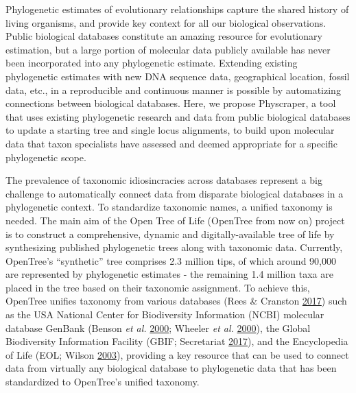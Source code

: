 \documentclass[]{article}
\begin{document}
Phylogenetic estimates of evolutionary relationships capture the shared history of living organisms, and provide key context for all our biological observations.
Public biological databases constitute an amazing resource for evolutionary estimation, but a large portion of molecular data publicly available has never been incorporated into any phylogenetic estimate. Extending existing phylogenetic estimates with new DNA sequence data, geographical location, fossil data, etc., in a reproducible and continuous manner is possible by automatizing connections between biological databases. Here, we propose Physcraper, a tool that uses existing phylogenetic research and data from public biological databases to update a starting tree and single locus alignments, to build upon molecular data that taxon specialists have assessed and deemed appropriate for a specific phylogenetic scope.

The prevalence of taxonomic idiosincracies across databases represent a big challenge to automatically connect data from disparate biological databases in a phylogenetic context. To standardize taxonomic names, a unified taxonomy is needed. The main aim of the Open Tree of Life (OpenTree from now on) project
is to construct a comprehensive, dynamic and digitally-available tree of life by synthesizing published phylogenetic trees along with taxonomic data. Currently, OpenTree's ``synthetic'' tree comprises 2.3 million tips, of which around 90,000 are represented by phylogenetic estimates - the remaining 1.4 million taxa are placed in the tree based on their taxonomic assignment. To achieve this, OpenTree unifies taxonomy from various databases (Rees \& Cranston \protect\hyperlink{ref-rees2017automated}{2017}) such as the USA National Center for Biodiversity Information (NCBI) molecular database GenBank (Benson \emph{et al.} \protect\hyperlink{ref-benson2000genbank}{2000}; Wheeler \emph{et al.} \protect\hyperlink{ref-wheeler2000database}{2000}), the Global Biodiversity Information Facility (GBIF; Secretariat \protect\hyperlink{ref-secretariat2017gbif}{2017}), and the Encyclopedia of Life (EOL; Wilson \protect\hyperlink{ref-wilson2003encyclopedia}{2003}), providing a key resource that can be used to connect data from virtually any biological database to phylogenetic data that has been standardized to OpenTree's unified taxonomy.
\end{document}
